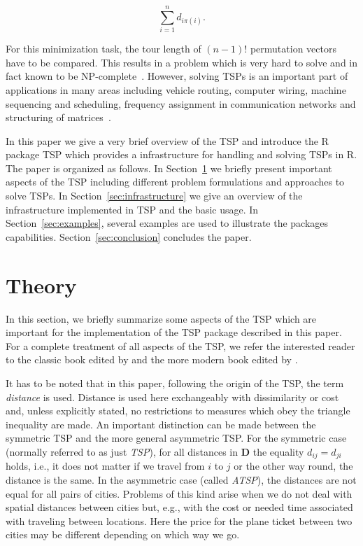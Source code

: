 \documentclass[10pt,a4paper,fleqn]{article}
\newcommand{\strong}[1]{{\normalfont\fontseries{b}\selectfont #1}}
\newcommand{\pkg}[1]{\strong{#1}}
\begin{document}
\begin{equation}
    \sum_{i=1}^n d_{i\pi(i)}.
\end{equation}

For this minimization task, the tour length of $(n-1)!$ permutation vectors
have to be compared. This results in a problem which is very hard to
solve and in fact known to be NP-complete~\citep{Johnson1985a}.
However, solving TSPs is an important part of applications in many areas
including vehicle routing, computer wiring, machine sequencing and scheduling,
frequency assignment in communication networks and structuring of
matrices~\citep{Lenstra1975, Punnen2002}.

In this paper we give a very brief overview of the TSP and introduce the
R package \pkg{TSP} which provides a infrastructure for handling and
solving TSPs in R.
The paper is organized as follows.
In Section~\ref{sec:TSP} we briefly present important aspects of the TSP
including different problem formulations and approaches to solve TSPs.  In
Section~\ref{sec:infrastructure} we give an overview of the infrastructure
implemented in \pkg{TSP} and the basic usage.  In Section~\ref{sec:examples},
several examples are used to illustrate the packages capabilities.  
Section~\ref{sec:conclusion} concludes the paper.

\section{Theory}\label{sec:TSP}
In this section, we briefly summarize some aspects of the TSP
which are important for the implementation of the \pkg{TSP} package
described in this paper. For a complete treatment of all aspects of the
TSP, we refer the interested reader to the classic book edited by
\cite{Lawler1985} and the more modern book edited by \cite{Gutin2002}.

It has to be noted that in this paper, following the origin of the TSP, the
term \emph{distance} is used.  Distance is used here exchangeably with
dissimilarity or cost and, unless explicitly stated, no restrictions to
measures which obey the triangle inequality are made.  An important distinction
can be made between the symmetric TSP and the more general asymmetric TSP.  For
the symmetric case (normally referred to as just \emph{TSP}), for all distances
in $\mathbf{D}$ the equality $d_{ij} = d_{ji}$ holds, i.e., it does not matter if we
travel from $i$ to $j$ or the other way round, the distance is the same. In the
asymmetric case (called \emph{ATSP}), the distances are not equal for all pairs
of cities. Problems of this kind arise when we do not deal with spatial
distances between cities but, e.g., with the cost or needed time associated
with traveling between locations. Here the price for the plane ticket between
two cities may be different depending on which way we go.
\end{document}
